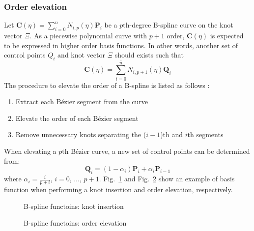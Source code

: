 \subsubsection{Order elevation}
\label{lr_sec:nurbs_order_ele}
Let $
\mathbf{C}(\eta) =  \sum_{i=0}^n
                    N_{i,p}(\eta)
                    \mathbf{P}_i
$
be a $p$th-degree B-spline curve on the knot vector $\Xi$.
As a piecewise polynomial curve with $p+1$ order, $\mathbf{C}(\eta)$ is expected to be expressed in higher order basis functions.
In other words, another set of control points $Q_i$ and knot vector $\Xi$ should exists such that
\begin{equation}
    \mathbf{C}(\eta) =  \sum_{i=0}^{\overline{n}}
                        N_{i, p+1}(\eta)
                        \mathbf{Q}_i
\end{equation}
The procedure to elevate the order of a B-spline is listed as follows \citep{Pie1997}:
\begin{enumerate}
    \item Extract each Bézier segment from the curve
    \item Elevate the order of each Bézier segment
    \item Remove unnecessary knots separating the ($i-1$)th and $i$th segments
\end{enumerate}
When elevating a $p$th Bézier curve, a new set of control points can be determined from:
\begin{equation}
    \mathbf{Q}_i =  (1-\alpha_i) \mathbf{P}_i +
                    \alpha_i \mathbf{P}_{i-1}
\end{equation}
where $\alpha_i=\frac{i}{p+i}$, $i=0$, $\dots$, $p+1$.
Fig.~\ref{lr_fig:nurbs_knotins} and Fig.~\ref{lr_fig:nurbs_orderele} show an example of basis function when performing a knot insertion and order elevation, respectively.

\begin{figure}[h!]
    \centering
    
    \caption{B-spline functoins: knot insertion}
    \label{lr_fig:nurbs_knotins}
\end{figure}

\begin{figure}[h!]
    \centering
    
    \caption{B-spline functoins: order elevation}
    \label{lr_fig:nurbs_orderele}
\end{figure}


